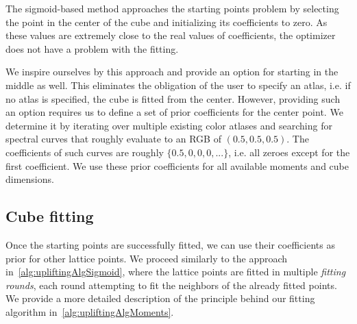 The sigmoid-based method approaches the starting points problem by selecting the point in the center of the cube and initializing its coefficients to zero. As these values are extremely close to the real values of coefficients, the optimizer does not have a problem with the fitting.

We inspire ourselves by this approach and provide an option for starting in the middle as well. This eliminates the obligation of the user to specify an atlas, i.e. if no atlas is specified, the cube is fitted from the center. However, providing such an option requires us to define a set of prior coefficients for the center point. We determine it by iterating over multiple existing color atlases and searching for spectral curves that roughly evaluate to an RGB of $(0.5, 0.5, 0.5)$. The coefficients of such curves are roughly $\{0.5, 0, 0, 0, ... \}$, i.e. all zeroes except for the first coefficient. We use these prior coefficients for all available moments and cube dimensions.

\subsection{Cube fitting}
Once the starting points are successfully fitted, we can use their coefficients as prior for other lattice points. We proceed similarly to the approach in~\cref{alg:upliftingAlgSigmoid}, where the lattice points are fitted in multiple \emph{fitting rounds}, each round attempting to fit the neighbors of the already fitted points. We provide a more detailed description of the principle behind our fitting algorithm in~\cref{alg:upliftingAlgMoments}.


